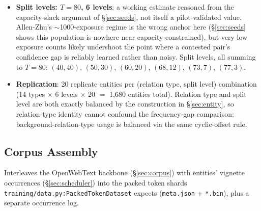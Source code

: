 \documentclass[11pt]{article}
\begin{document}
\begin{itemize}
  \item \textbf{Split levels: $T=80$, 6 levels}: a working estimate reasoned
    from the capacity-slack argument of \S\ref{sec:seeds}, not itself a
    pilot-validated value. Allen-Zhu's $\sim$1000-exposure regime is the
    wrong anchor here (\S\ref{sec:seeds} shows this population is nowhere
    near capacity-constrained), but very low exposure counts likely
    undershoot the point where a contested pair's confidence gap is reliably
    learned rather than noisy. Split levels, all summing to $T=80$:
    $(40,40)$, $(50,30)$, $(60,20)$, $(68,12)$, $(73,7)$, $(77,3)$.
  \item \textbf{Replication}: 20 replicate entities per (relation type, split
    level) combination (14 types $\times$ 6 levels $\times$ 20 $=$ 1{,}680
    entities total). Relation type and split level are both exactly balanced
    by the construction in \S\ref{sec:entity}, so relation-type identity
    cannot confound the frequency-gap comparison; background-relation-type
    usage is balanced via the same cyclic-offset rule.
\end{itemize}

\subsection{Corpus Assembly}
\label{sec:assembly}

Interleaves the OpenWebText backbone (\S\ref{sec:corpus}) with entities'
vignette occurrences (\S\ref{sec:scheduler}) into the packed token shards
\texttt{training/data.py:PackedTokenDataset} expects (\texttt{meta.json} +
\texttt{*.bin}), plus a separate occurrence log.
\end{document}
